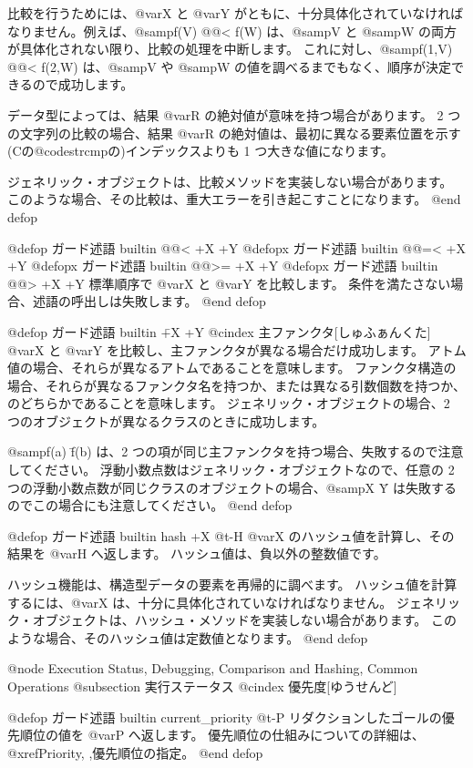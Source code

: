 {比較を行うためには、@var{X} と @var{Y} がともに、十分具体化されていなければなりません。例えば、@samp{f(V) @@< f(W)} は、@samp{V} と @samp{W} の両方が具体化されない限り、比較の処理を中断します。
これに対し、@samp{f(1,V) @@< f(2,W)} は、@samp{V} や @samp{W} の値を調べるまでもなく、順序が決定できるので成功します。

データ型によっては、結果 @var{R} の絶対値が意味を持つ場合があります。
2 つの文字列の比較の場合、結果 @var{R} の絶対値は、最初に異なる要素位置を示す(Cの@code{strcmp}の)インデックスよりも 1 つ大きな値になります。

ジェネリック・オブジェクトは、比較メソッドを実装しない場合があります。
このような場合、その比較は、重大エラーを引き起こすことになります。
@end defop

@defop {ガード述語} {builtin} @@< +X +Y
@defopx {ガード述語} {builtin} @@=< +X +Y
@defopx {ガード述語} {builtin} @@>= +X +Y
@defopx {ガード述語} {builtin} @@> +X +Y
標準順序で @var{X} と @var{Y} を比較します。
条件を満たさない場合、述語の呼出しは失敗します。
@end defop

@defop {ガード述語} {builtin} \= +X +Y
@cindex 主ファンクタ[しゅふぁんくた]
 @var{X} と @var{Y} を比較し、主ファンクタが異なる場合だけ成功します。
アトム値の場合、それらが異なるアトムであることを意味します。
ファンクタ構造の場合、それらが異なるファンクタ名を持つか、または異なる引数個数を持つか、のどちらかであることを意味します。
ジェネリック・オブジェクトの場合、2 つのオブジェクトが異なるクラスのときに成功します。

@samp{f(a) \= f(b)} は、2 つの項が同じ主ファンクタを持つ場合、失敗するので注意してください。
浮動小数点数はジェネリック・オブジェクトなので、任意の 2 つの浮動小数点数が同じクラスのオブジェクトの場合、@samp{X \= Y} は失敗するのでこの場合にも注意してください。
@end defop

@defop {ガード述語} {builtin} hash +X @t{-}H
 @var{X} のハッシュ値を計算し、その結果を @var{H} へ返します。
ハッシュ値は、負以外の整数値です。                

ハッシュ機能は、構造型データの要素を再帰的に調べます。
ハッシュ値を計算するには、@var{X} は、十分に具体化されていなければなりません。
ジェネリック・オブジェクトは、ハッシュ・メソッドを実装しない場合があります。
このような場合、そのハッシュ値は定数値となります。
@end defop

@node Execution Status, Debugging, Comparison and Hashing, Common Operations
@subsection 実行ステータス
@cindex 優先度[ゆうせんど]

@defop {ガード述語} {builtin} current_priority @t{-}P
リダクションしたゴールの優先順位の値を @var{P} へ返します。
優先順位の仕組みについての詳細は、@xref{Priority, ,優先順位の指定}。
@end defop

}
